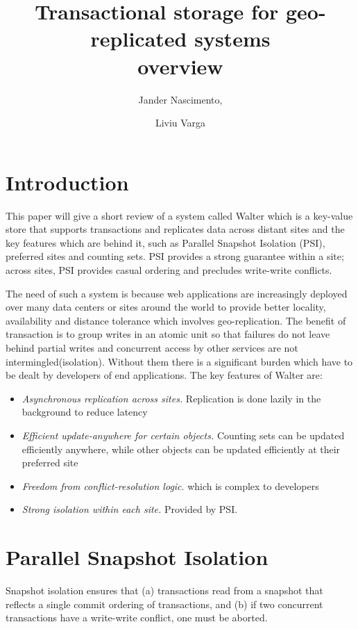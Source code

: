 \documentclass[a4paper]{article}
\begin{document}
\title{Transactional storage for geo-replicated systems \\ overview}

\author{Jander Nascimento,
\and Liviu Varga}

\maketitle



\section{Introduction}
This paper will give a short review of a system called Walter which is a key-value store that supports transactions and replicates data across distant sites and the key features which are behind it, such as Parallel Snapshot Isolation (PSI), preferred sites and counting sets. PSI provides a strong guarantee within a site; across sites, PSI provides casual ordering and precludes write-write conflicts.

The need of such a system is because web applications are increasingly deployed over many data centers or sites around the world to provide better locality, availability and distance tolerance which involves geo-replication. The benefit of transaction is to group writes in an atomic unit so that failures do not leave behind partial writes and concurrent access by other services are not intermingled(isolation). Without them there is a significant burden which have to be dealt by developers of end applications. The key features of Walter are:
\begin{itemize}
\item \textit{Asynchronous replication across sites.} Replication is done lazily in the background to reduce latency
\item \textit{Efficient update-anywhere for certain objects.} Counting sets can be updated efficiently anywhere, while other objects can be updated efficiently at their preferred site
\item \textit{Freedom from conflict-resolution logic}. which is complex to developers
\item \textit{Strong isolation within each site.} Provided by PSI.
\end{itemize}
          
\section{Parallel Snapshot Isolation}
Snapshot isolation ensures that (a) transactions read from a snapshot that reflects a single commit ordering of transactions, and (b) if two concurrent transactions have a write-write conflict, one must be aborted.
 
\end{document}

